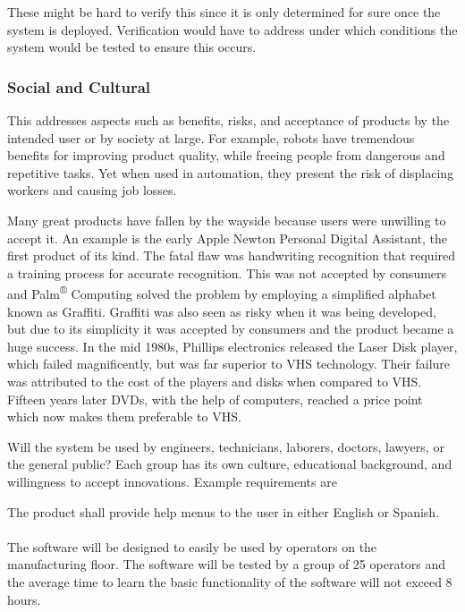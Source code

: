 These might be hard to verify this since it is only determined for sure
once the system is deployed. Verification would have to address under
which conditions the system would be tested to ensure this occurs.


\subsubsection*{Social and Cultural}
\label{subsection:social-and-cultural}

This addresses aspects such as benefits, risks, and acceptance of
products by the intended user or by society at large. For example,
robots have tremendous benefits for improving product quality, while
freeing people from dangerous and repetitive tasks. Yet when used in
automation, they present the risk of displacing workers and causing job
losses.

Many great products have fallen by the wayside because users were
unwilling to accept it. An example is the early Apple Newton Personal
Digital Assistant, the first product of its kind. The fatal flaw was
handwriting recognition that required a training process for accurate
recognition. This was not accepted by consumers and
Palm\textsuperscript{®} Computing solved the problem by employing a
simplified alphabet known as Graffiti. Graffiti was also seen as risky
when it was being developed, but due to its simplicity it was accepted
by consumers and the product became a huge success. In the mid 1980s,
Phillips electronics released the Laser Disk player, which failed
magnificently, but was far superior to VHS technology. Their failure was
attributed to the cost of the players and disks when compared to VHS.
Fifteen years later DVDs, with the help of computers, reached a price
point which now makes them preferable to VHS.

Will the system be used by engineers, technicians, laborers, doctors,
lawyers, or the general public? Each group has its own culture,
educational background, and willingness to accept innovations. Example
requirements are

\begin{itquote}
The product shall provide help menus to the user in either English or
Spanish. \\ \\
The software will be designed to easily be used by operators on the
manufacturing floor. The software will be tested by a group of 25
operators and the average time to learn the basic functionality of the
software will not exceed 8 hours.
\end{itquote}

